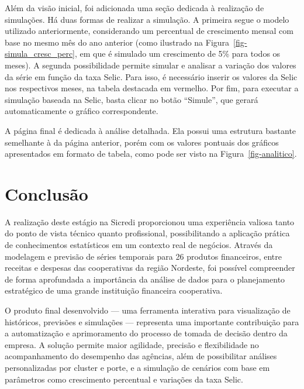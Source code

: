 \documentclass[
  12pt,
  a4paper,
]{scrreprt}
\begin{document}
Além da visão inicial, foi adicionada uma seção dedicada à realização de
simulações. Há duas formas de realizar a simulação. A primeira segue o
modelo utilizado anteriormente, considerando um percentual de
crescimento mensal com base no mesmo mês do ano anterior (como ilustrado
na Figura~\ref{fig-simula_cresc_perc}, em que é simulado um crescimento
de 5\% para todos os meses). A segunda possibilidade permite simular e
analisar a variação dos valores da série em função da taxa Selic. Para
isso, é necessário inserir os valores da Selic nos respectivos meses, na
tabela destacada em vermelho. Por fim, para executar a simulação baseada
na Selic, basta clicar no botão ``Simule'', que gerará automaticamente o
gráfico correspondente.

\vspace{12pt}

A página final é dedicada à análise detalhada. Ela possui uma estrutura
bastante semelhante à da página anterior, porém com os valores pontuais
dos gráficos apresentados em formato de tabela, como pode ser visto na
Figura~\ref{fig-analitico}.

\chapter{Conclusão}\label{conclusuxe3o}

A realização deste estágio na Sicredi proporcionou uma experiência
valiosa tanto do ponto de vista técnico quanto profissional,
possibilitando a aplicação prática de conhecimentos estatísticos em um
contexto real de negócios. Através da modelagem e previsão de séries
temporais para 26 produtos financeiros, entre receitas e despesas das
cooperativas da região Nordeste, foi possível compreender de forma
aprofundada a importância da análise de dados para o planejamento
estratégico de uma grande instituição financeira cooperativa.

\vspace{12pt}

O produto final desenvolvido --- uma ferramenta interativa para
visualização de históricos, previsões e simulações --- representa uma
importante contribuição para a automatização e aprimoramento do processo
de tomada de decisão dentro da empresa. A solução permite maior
agilidade, precisão e flexibilidade no acompanhamento do desempenho das
agências, além de possibilitar análises personalizadas por cluster e
porte, e a simulação de cenários com base em parâmetros como crescimento
percentual e variações da taxa Selic.
\end{document}
